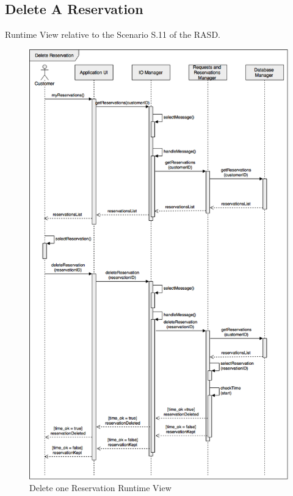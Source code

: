 \documentclass[../../../../../../dd.tex]{subfiles}
\begin{document}
	\subsection{Delete A Reservation}
		Runtime View relative to the Scenario S.11 of the RASD.
		\begin{figure}[H]
				\centering
				\includegraphics[width=\textwidth, scale=0.5]{../images/SequenceDiagrams/deleteReservation.png}
			\caption{Delete one Reservation Runtime View}\label{fig:RuntimeDeleteReservation}
		\end{figure}
		
\end{document}
